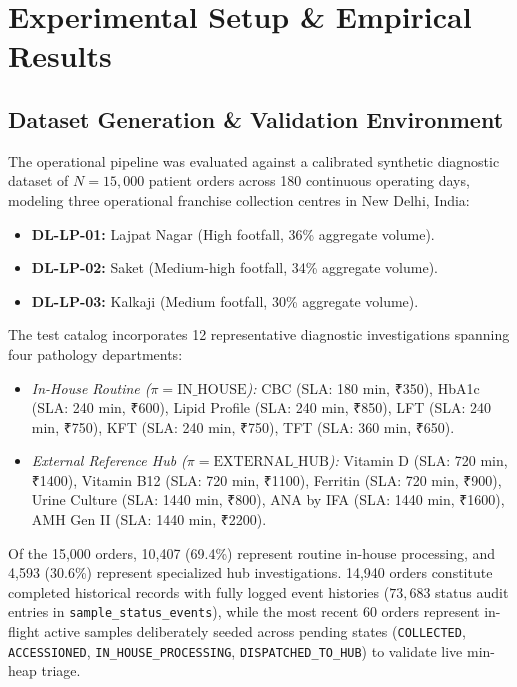 \documentclass[conference]{IEEEtran}
\begin{document}
\section{Experimental Setup \& Empirical Results}

\subsection{Dataset Generation \& Validation Environment}
The operational pipeline was evaluated against a calibrated synthetic diagnostic dataset of $N = 15,000$ patient orders across 180 continuous operating days, modeling three operational franchise collection centres in New Delhi, India:
\begin{itemize}
    \item \textbf{DL-LP-01:} Lajpat Nagar (High footfall, 36\% aggregate volume).
    \item \textbf{DL-LP-02:} Saket (Medium-high footfall, 34\% aggregate volume).
    \item \textbf{DL-LP-03:} Kalkaji (Medium footfall, 30\% aggregate volume).
\end{itemize}

The test catalog incorporates 12 representative diagnostic investigations spanning four pathology departments:
\begin{itemize}
    \item \textit{In-House Routine ($\pi = \text{IN\_HOUSE}$):} CBC (SLA: 180 min, ₹350), HbA1c (SLA: 240 min, ₹600), Lipid Profile (SLA: 240 min, ₹850), LFT (SLA: 240 min, ₹750), KFT (SLA: 240 min, ₹750), TFT (SLA: 360 min, ₹650).
    \item \textit{External Reference Hub ($\pi = \text{EXTERNAL\_HUB}$):} Vitamin D (SLA: 720 min, ₹1400), Vitamin B12 (SLA: 720 min, ₹1100), Ferritin (SLA: 720 min, ₹900), Urine Culture (SLA: 1440 min, ₹800), ANA by IFA (SLA: 1440 min, ₹1600), AMH Gen II (SLA: 1440 min, ₹2200).
\end{itemize}

Of the 15,000 orders, 10,407 (69.4\%) represent routine in-house processing, and 4,593 (30.6\%) represent specialized hub investigations. 14,940 orders constitute completed historical records with fully logged event histories ($73,683$ status audit entries in \texttt{sample\_status\_events}), while the most recent 60 orders represent in-flight active samples deliberately seeded across pending states (\texttt{COLLECTED}, \texttt{ACCESSIONED}, \texttt{IN\_HOUSE\_PROCESSING}, \texttt{DISPATCHED\_TO\_HUB}) to validate live min-heap triage.
\end{document}
